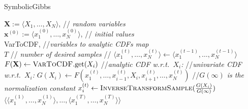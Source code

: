 \documentclass{article}
\newcommand{\tuple}[1] {\langle #1 \rangle}
\newcommand{\bvec}[1]{\textbf{#1}}
\begin{document}
\begin{algorithm}[hb!]%
\caption{{\sc SymbolicGibbs}  
\label{alg:symbolic-gibbs}}
\begin{algorithmic}
{$\bvec{X} := \tuple{X_1, \ldots, X_N}$, 				\hspace*{\fill}// \emph{\small random variables} \\
 $\bvec{x}^{(0)} := \tuple{x_1^{(0)}, \ldots, x_N^{(0)}}$, 	\hspace*{\fill}// \emph{\small initial values} \\
{\sc VarToCDF}, 								\hspace*{\fill}//\emph{\small variables to analytic CDFs map} \\
 $T$ 										\hspace*{\fill}// \emph{\small number of desired samples } }
//%
{\small
	 \STATE $\tuple{x_1^{(t)}, \ldots, x_N^{(t)}} \leftarrow \tuple{x_1^{(t-1)}, \ldots, x_N^{(t-1)}}$    
	\FOR{ {\bf each} $X_i \in \bvec{X}$}
		\STATE $F(\bvec{X}) \leftarrow \textsc{VarToCDF}.\text{get}(X_i)$ //\emph{analytic CDF w.r.t.\ $X_i$:}
		\STATE //\emph{univariate CDF w.r.t.\ $X_i$:}
		\STATE 	$G(X_i) \leftarrow F(x_1^{(t)}, \ldots, x_{i-1}^{(t)}, X_i, x_{i+1}^{(t)}, \ldots, x_N^{(t)})$ 
		\STATE //\emph{$G(\infty)$ is the normalization constant}
		\STATE $x_i^{(t)} \leftarrow \textsc{InverseTransformSample}(\frac{G(X_i)}{G(\infty)})$
	\ENDFOR %
\ENDFOR %
 {$\big\langle
			\tuple{x_1^{(1)}, \ldots, x_N^{(1)}}, \ldots, 
			\tuple{x_1^{(T)}, \ldots, x_N^{(T)}}
		\big\rangle$}\;
%	
} %
\end{algorithmic}
\end{algorithm}
\end{document}
